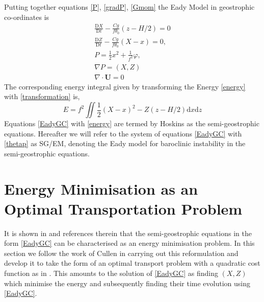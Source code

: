 Putting together equations \ref{P}, \ref{gradP}, \ref{Gmom} the Eady Model in geostrophic co-ordinates is 
\begin{equation}
\begin{aligned}
\frac{\mathrm{D}X}{\mathrm{D}t} -\frac{Cg}{f\theta _0}\left(z-H/2\right) = 0 \\
\frac{\mathrm{D}Z}{\mathrm{D}t} - \frac{Cg}{f\theta_0}\left(X - x\right) = 0,\\
P = \frac{1}{2}x^2 + \frac{1}{f^2}\varphi,\\
\nabla P = (X,Z)\\
\nabla \cdot \bm{U} = 0
\end{aligned}
\label{EadyGC}
\end{equation}
The corresponding energy integral given by transforming the Energy \ref{energy} with \ref{transformation} is,
\begin{equation}
E = f^2 \iint \frac{1}{2}\left(X-x\right)^2 - Z\left(z - H/2\right)\textrm{d}x\textrm{d}z
\label{energy}
\end{equation}
Equations \ref{EadyGC} with \ref{energy} are termed by Hoskins as the semi-geostrophic equations\cite{Hoskins1975}. Hereafter we will refer to the system of equations \ref{EadyGC} with \ref{thetap} as SG/EM, denoting the Eady model for baroclinic instability in the semi-geostrophic equations.
\section{Energy Minimisation as an Optimal Transportation Problem}
It is shown in \cite{Cullen2006a} and references therein that the semi-geostrophic equations in the form \ref{EadyGC} can be characterised as an energy minimisation problem. In this section we follow the work of Cullen \cite{Cullen2006a} in carrying out this reformulation and develop it to take the form of an optimal transport problem with a quadratic cost function as in \cite{Merigot2017a}. This amounts to the solution of \ref{EadyGC} as finding $\left(X, Z\right)$ which minimise the energy and subsequently finding their time evolution using \ref{EadyGC}.

